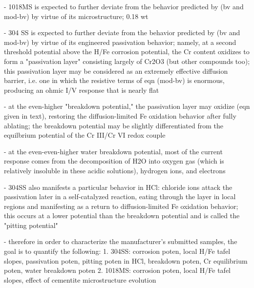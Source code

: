 - 1018MS is expected to further deviate from the behavior predicted by (bv and mod-bv) by virtue of its microstructure; 0.18 wt%

- 304 SS is expected to further deviate from the behavior predicted by (bv and mod-bv) by virtue of its engineered passivation behavior; namely, at a second threshold potential above the H/Fe corrosion potential, the Cr content oxidizes to form a "passivation layer" consisting largely of Cr2O3 (but other compounds too); this passivation layer may be considered as an extremely effective diffusion barrier, i.e. one in which the resistive terms of eqn (mod-bv) is enormous, producing an ohmic I/V response that is nearly flat

- at the even-higher "breakdown potential," the passivation layer may oxidize (eqn given in text), restoring the diffusion-limited Fe oxidation behavior after fully ablating; the breakdown potential may be slightly differentiated from the equilbrium potential of the Cr III/Cr VI redox couple

- at the even-even-higher water breakdown potential, most of the current response comes from the decomposition of H2O into oxygen gas (which is relatively insoluble in these acidic solutions), hydrogen ions, and electrons

- 304SS also manifests a particular behavior in HCl: chloride ions attack the passivation later in a self-catalyzed reaction, eating through the layer in local regions and manifesting as a return to diffusion-limited Fe oxidation behavior; this occurs at a lower potential than the breakdown potential and is called the "pitting potential"

- therefore in order to characterize the manufacturer's submitted samples, the goal is to quantify the following:
	1. 304SS: corrosion poten, local H/Fe tafel slopes, passivation poten, pitting poten in HCl, breakdown poten, Cr equilibrium poten, water breakdown poten
	2. 1018MS: corrosion poten, local H/Fe tafel slopes, effect of cementite microstructure evolution
